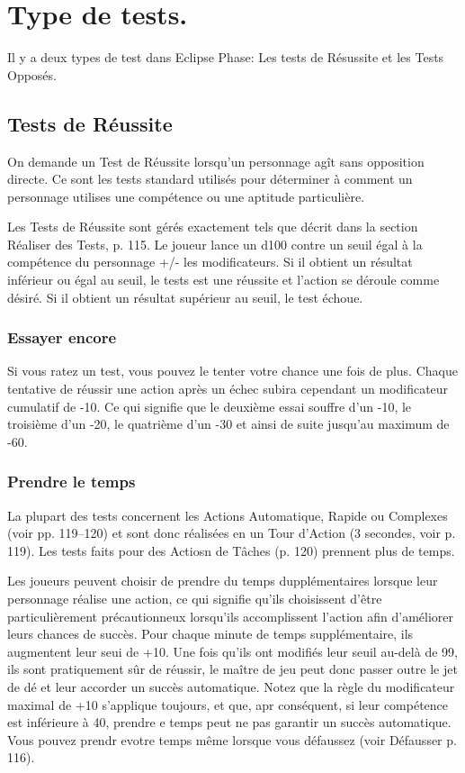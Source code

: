 \section{Type de tests.} \label{sec:types-tests} 

Il y a deux types de test dans Eclipse Phase: Les tests de Résussite  et les Tests Opposés. 

\subsection{Tests de Réussite} \label{sec:success-tests} 

On demande un Test de Réussite lorsqu'un personnage agît sans opposition directe. Ce sont les tests standard utilisés pour déterminer à comment un personnage utilises une compétence ou une aptitude particulière. 

Les Tests de Réussite sont gérés exactement tels que décrit dans la section Réaliser des Tests, p. 115. Le joueur lance un d100 contre un seuil égal à la compétence du personnage +/- les modificateurs. Si il obtient un résultat inférieur ou égal au seuil, le tests est une réussite et l'action se déroule comme désiré. Si il obtient un résultat supérieur au seuil, le test échoue. 

\subsubsection{Essayer encore} \label{sec:trying-again} 

Si vous ratez un test, vous pouvez le tenter votre chance une fois de plus. Chaque tentative de réussir une action après un échec subira cependant un modificateur cumulatif de -10. Ce qui signifie que le deuxième essai souffre d'un -10, le troisième d'un -20, le quatrième d'un -30 et ainsi de suite jusqu'au maximum de -60. 

\subsubsection{Prendre le temps} \label{sec:taking-time} 

La plupart des tests concernent les Actions Automatique, Rapide ou Complexes (voir pp. 119–120) et sont donc réalisées en un Tour d'Action (3 secondes, voir p. 119). Les tests faits pour des Actiosn de Tâches (p. 120) prennent plus de temps. 

Les joueurs peuvent choisir de prendre du temps dupplémentaires lorsque leur personnage réalise une action, ce qui signifie qu'ils choisissent d'être particulièrement précautionneux lorsqu'ils accomplissent l'action afin d'améliorer leurs chances de succès. Pour chaque minute de temps supplémentaire, ils augmentent leur seui de +10. Une fois qu'ils ont modifiés leur seuil au-delà de 99, ils sont pratiquement sûr de réussir, le maître de jeu peut donc passer outre le jet de dé et leur accorder un succès automatique. Notez que la règle du modificateur maximal de +10 s'applique toujours, et que, apr conséquent, si leur compétence est inférieure à 40, prendre e temps peut ne pas garantir un succès automatique. Vous pouvez prendr evotre temps même lorsque vous défaussez (voir Défausser p. 116). 

